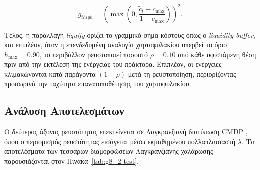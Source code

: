 \[
g_{t high}
=
\left(
\max\left(
0,\frac{\tilde c_t-c_{\max}}
{1-c_{\max}}
\right)
\right)^2.
\]

Τέλος, η παραλλαγή \textit{liquify} ορίζει το γραμμικό σήμα κόστους όπως ο \textit{liquidity buffer}, 
και επιπλέον, όταν η επενδεδυμένη αναλογία χαρτοφυλακίου υπερβεί το όριο
$h_{\max}=0.90$, το περιβάλλον ρευστοποιεί ποσοστό
$\rho=0.10$ από κάθε υφιστάμενη θέση πριν από την εκτέλεση της
ενέργειας του πράκτορα. Επιπλέον, οι ενέργειες κλιμακώνονται κατά
παράγοντα $(1-\rho)$ μετά τη ρευστοποίηση, περιορίζοντας προσωρινά
την ταχύτητα επανατοποθέτησης του χαρτοφυλακίου.

\subsection{Ανάλυση Αποτελεσμάτων}
\label{subsec:exp-lagrangian-design}

Ο δεύτερος άξονας ρευστότητας επεκτείνεται σε Λαγκρανζιανή διατύπωση CMDP \cite{altman1999cmdp}, όπου ο περιορισμός ρευστότητας εισάγεται 
μέσω εκμαθημένου πολλαπλασιαστή $\lambda$. Τα αποτελέσματα των τεσσάρων διαμορφώσεων Λαγκρανζιανής χαλάρωσης παρουσιάζονται στον Πίνακα~\ref{tab:g8_2-test}.

\begin{table}[htbp]
  \centering
  \caption{Αποτελέσματα τεσσάρων Λαγκρανζιανών διαμορφώσεων ρευστότητας (PPO-LSTM, ενεργή απόδοση, κόστος $10^{-4}$, περίοδος αξιολόγησης 2024--2025, μέσος $\pm$ τυπική απόκλιση 5 εκτελέσεων).}
  \label{tab:g8_2-test}
  \small
\end{table}

